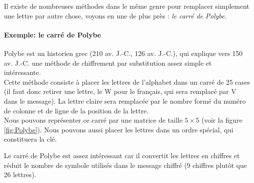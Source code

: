Il existe de nombreuses méthodes dans le même genre pour remplacer
simplement une lettre par autre chose, voyons en une de plus près :
\emph{le carré de Polybe.}\\

\paragraph{Exemple: le carré de Polybe\label{syst:CarrePolybe}}
Polybe est un historien grec (210 av. J.-C., 126 av. J.-C.), qui
explique vers 150 av. J.-C. une méthode de chiffrement par
substitution assez simple et intéressante.\\

Cette méthode consiste à placer les lettres de l'alphabet dans un
carré de 25 cases (il faut donc retirer une lettre, le W pour le
français, qui sera remplacé par V dans le message). La lettre
claire
sera remplacée par le nombre formé du numéro de colonne et de
ligne de la position de la lettre.\\

Nous pouvons représenter ce carré par une matrice de taille $5\times 5$
(voir la figure \ref{fig:Polybe}). Nous pouvons aussi placer les
lettres dans un ordre spécial, qui constituera la clé.

Le carré de Polybe est assez intéressant car il convertit les lettres
en chiffres et réduit le nombre de symbole utilisés dans le message
chiffré (9 chiffres plutôt que 26 lettres). \\

